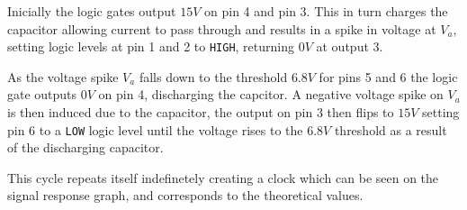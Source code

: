\documentclass[11pt, openright]{book}
\begin{document}
Inicially the logic gates output $15V$ on pin 4 and pin 3. This in turn charges the capacitor allowing current to pass through and results in a spike in voltage at $V_a$, setting logic levels at pin 1 and 2 to \verb|HIGH|, returning $0V$  at output 3.

As the voltage spike $V_a$ falls down to the threshold $6.8V$ for pins 5 and 6 the logic gate outputs $0V$ on pin 4, discharging the capcitor. A negative voltage spike on $V_a$ is then induced due to the capacitor, the output on pin 3 then flips to  $15V$ setting pin 6 to a \verb|LOW| logic level until the voltage rises to the $6.8V$ threshold as a result of the discharging capacitor.

This cycle repeats itself indefinetely creating a clock which can be seen on the signal response graph, and corresponds to the theoretical values.
\end{document}
